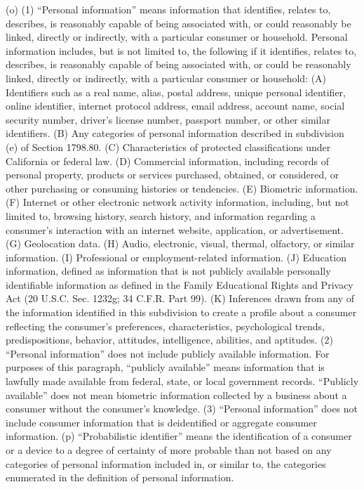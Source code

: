 (o) (1) “Personal information” means information that identifies, relates to, describes, is reasonably capable of being associated with, or could reasonably be linked, directly or indirectly, with a particular consumer or household. Personal information includes, but is not limited to, the following if it identifies, relates to, describes, is reasonably capable of being associated with, or could be reasonably linked, directly or indirectly, with a particular consumer or household:
(A) Identifiers such as a real name, alias, postal address, unique personal identifier, online identifier, internet protocol address, email address, account name, social security number, driver’s license number, passport number, or other similar identifiers.
(B) Any categories of personal information described in subdivision (e) of Section 1798.80.
(C) Characteristics of protected classifications under California or federal law.
(D) Commercial information, including records of personal property, products or services purchased, obtained, or considered, or other purchasing or consuming histories or tendencies.
(E) Biometric information.
(F) Internet or other electronic network activity information, including, but not limited to, browsing history, search history, and information regarding a consumer’s interaction with an internet website, application, or advertisement.
(G) Geolocation data.
(H) Audio, electronic, visual, thermal, olfactory, or similar information.
(I) Professional or employment-related information.
(J) Education information, defined as information that is not publicly available personally identifiable information as defined in the Family Educational Rights and Privacy Act (20 U.S.C. Sec. 1232g; 34 C.F.R. Part 99).
(K) Inferences drawn from any of the information identified in this subdivision to create a profile about a consumer reflecting the consumer’s preferences, characteristics, psychological trends, predispositions, behavior, attitudes, intelligence, abilities, and aptitudes.
(2) “Personal information” does not include publicly available information. For purposes of this paragraph, “publicly available” means information that is lawfully made available from federal, state, or local government records. “Publicly available” does not mean biometric information collected by a business about a consumer without the consumer’s knowledge.
(3) “Personal information” does not include consumer information that is deidentified or aggregate consumer information.
(p) “Probabilistic identifier” means the identification of a consumer or a device to a degree of certainty of more probable than not based on any categories of personal information included in, or similar to, the categories enumerated in the definition of personal information.
